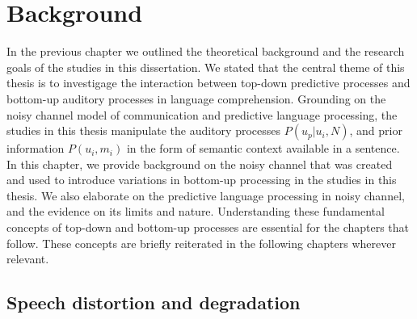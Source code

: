 \documentclass[a4paper, nobind]{templates/ociamthesis}
\begin{document}
\hypertarget{chapter-background}{%
\chapter{Background}\label{chapter-background}}

In the previous chapter we outlined the theoretical background and the research goals of the studies in this dissertation.
We stated that the central theme of this thesis is to investigage the interaction between top-down predictive processes and bottom-up auditory processes in language comprehension.
Grounding on the noisy channel model of communication and predictive language processing,
the studies in this thesis manipulate the auditory processes \(P(u_p|u_i,N)\), and prior information \(P(u_i,m_i)\) in the form of semantic context available in a sentence.
In this chapter, we provide background on the noisy channel that was created and used to introduce variations in bottom-up processing in the studies in this thesis.
We also elaborate on the predictive language processing in noisy channel, and the evidence on its limits and nature.
Understanding these fundamental concepts of top-down and bottom-up processes are essential for the chapters that follow.
These concepts are briefly reiterated in the following chapters wherever relevant.

\hypertarget{distortion-degradation}{%
\section{Speech distortion and degradation}\label{distortion-degradation}}
\end{document}
